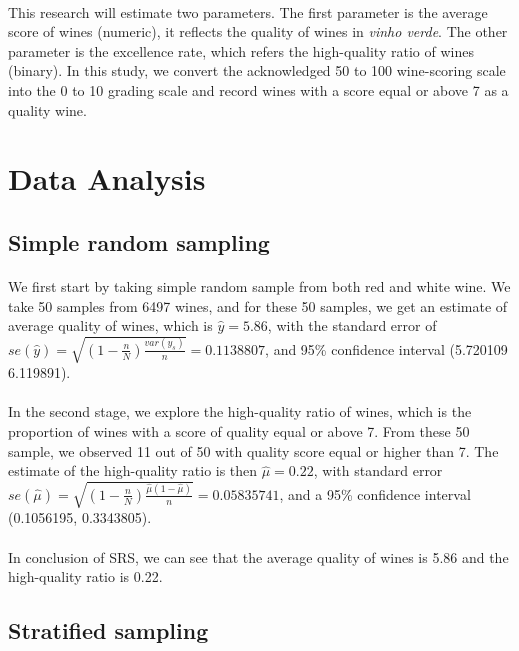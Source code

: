 \documentclass{article}
\begin{document}
\paragraph{}
This research will estimate two parameters. The first parameter is the average score of wines (numeric), it reflects the quality of wines in \textit{vinho verde}. The other parameter is the excellence rate, which refers the high-quality ratio of wines (binary). In this study, we convert the acknowledged 50 to 100 wine-scoring scale into the 0 to 10 grading scale and record wines with a score equal or above 7 as a quality wine. 
\section{Data Analysis}
\subsection{Simple random sampling}
\paragraph{}
We first start by taking simple random sample from both red and white wine. We take 50 samples from 6497 wines, and for these 50 samples, we get an estimate of average quality of wines, which is $\hat{y}=5.86$, with the standard error of $se(\hat{y})=\sqrt{{(1-\frac{n}{N})}\frac{var({y}_{s})}{n}}=0.1138807$, and 95\% confidence interval (5.720109 6.119891). 
\paragraph{}
In the second stage, we explore the high-quality ratio of wines, which is the proportion of wines with a score of quality equal or above 7. From these 50 sample, we observed 11 out of 50 with quality score equal or higher than 7. The estimate of the high-quality ratio is then  $\hat{\mu}=0.22$, with standard error $se(\hat{\mu})=\sqrt{{(1-\frac{n}{N})}\frac{\hat{\mu}(1-\hat{\mu})}{n}}=0.05835741$, and a 95\% confidence interval (0.1056195, 0.3343805).
\paragraph{}
In conclusion of SRS, we can see that the average quality of wines is 5.86 and the high-quality ratio is 0.22.
\subsection{Stratified sampling}
\end{document}
